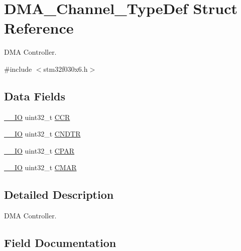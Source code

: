 \hypertarget{struct_d_m_a___channel___type_def}{}\section{D\+M\+A\+\_\+\+Channel\+\_\+\+Type\+Def Struct Reference}
\label{struct_d_m_a___channel___type_def}


D\+MA Controller.  




{\ttfamily \#include $<$stm32f030x6.\+h$>$}

\subsection*{Data Fields}
\begin{DoxyCompactItemize}
\item 
\hyperlink{core__sc300_8h_aec43007d9998a0a0e01faede4133d6be}{\+\_\+\+\_\+\+IO} uint32\+\_\+t \hyperlink{struct_d_m_a___channel___type_def_a5e1322e27c40bf91d172f9673f205c97}{C\+CR}
\item 
\hyperlink{core__sc300_8h_aec43007d9998a0a0e01faede4133d6be}{\+\_\+\+\_\+\+IO} uint32\+\_\+t \hyperlink{struct_d_m_a___channel___type_def_aae019365e4288337da20775971c1a123}{C\+N\+D\+TR}
\item 
\hyperlink{core__sc300_8h_aec43007d9998a0a0e01faede4133d6be}{\+\_\+\+\_\+\+IO} uint32\+\_\+t \hyperlink{struct_d_m_a___channel___type_def_a07aacf332c9bf310ff5be02140f892e1}{C\+P\+AR}
\item 
\hyperlink{core__sc300_8h_aec43007d9998a0a0e01faede4133d6be}{\+\_\+\+\_\+\+IO} uint32\+\_\+t \hyperlink{struct_d_m_a___channel___type_def_ab51edd49cb9294ebe2db18fb5cf399dd}{C\+M\+AR}
\end{DoxyCompactItemize}


\subsection{Detailed Description}
D\+MA Controller. 

\subsection{Field Documentation}
\mbox{\label{struct_d_m_a___channel___type_def_a5e1322e27c40bf91d172f9673f205c97}} 
